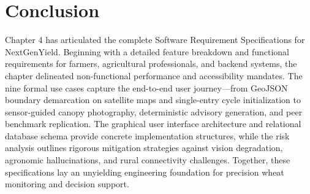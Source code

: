 \clearpage
\section{Conclusion}
Chapter 4 has articulated the complete Software Requirement Specifications for NextGenYield. Beginning with a detailed feature breakdown and functional requirements for farmers, agricultural professionals, and backend systems, the chapter delineated non-functional performance and accessibility mandates. The nine formal use cases capture the end-to-end user journey---from GeoJSON boundary demarcation on satellite maps and single-entry cycle initialization to sensor-guided canopy photography, deterministic advisory generation, and peer benchmark replication. The graphical user interface architecture and relational database schema provide concrete implementation structures, while the risk analysis outlines rigorous mitigation strategies against vision degradation, agronomic hallucinations, and rural connectivity challenges. Together, these specifications lay an unyielding engineering foundation for precision wheat monitoring and decision support.
